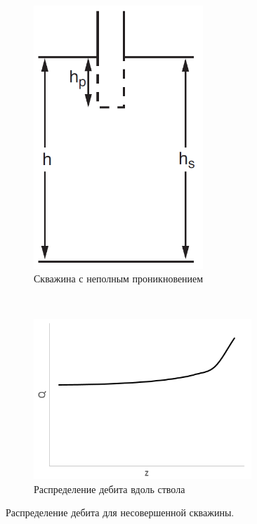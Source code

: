 \begin{figure}[H]

	\begin{subfigure}[b]{0.5\textwidth}
	\centering
	\includegraphics[width=0.7\textwidth]{pic/part_penetrating.png}
	\caption{Скважина с неполным проникновением}
	\label{pic:part_problem}
	\end{subfigure}
~
	\begin{subfigure}[b]{0.5\textwidth}
		\centering
		\includegraphics[width=0.9\textwidth]{pic/rate_distr.png}
		\caption{Распределение дебита вдоль ствола}
		\label{pic:rate_distr}
	\end{subfigure}
	\caption{Распределение дебита для несовершенной скважины.}
	\label{pic:part_pen}
\end{figure}

